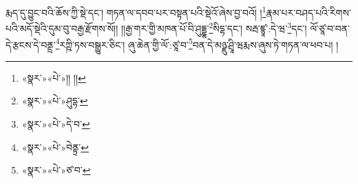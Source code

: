 རྨད་དུ་བྱུང་བའི་ཆོས་ཀྱི་སྡེ་དང་། གཏན་ལ་དབབ་པར་བསྟན་པའི་སྡེའོ་ཞེས་བྱ་བའོ། །\footnote{«སྣར་»«པེ་»།། །།}རྣམ་པར་བཤད་པའི་རིགས་པའི་མདོ་སྡེའི་དུམ་བུ་བརྒྱ་རྫོགས་སོ།། །།རྒྱ་གར་གྱི་མཁན་པོ་བི་ཤུདྡྷ་\footnote{«སྣར་»«པེ་»ཤུདྷ་}སིདྷ་དང་། སརྦ་ཛྙཱ་:དེ་ཝ་\footnote{«སྣར་»«པེ་»དེ་བ་}དང་། ལོ་ཙཱ་བ་བན་དེ་རྩངས་དེ་བནྡྲ་\footnote{«སྣར་»«པེ་»བེནྟྲ་}རཀྵི་ཏས་བསྒྱུར་ཅིང་། ཞུ་ཆེན་གྱི་ལོ་:ཙཱ་བ་\footnote{«སྣར་»«པེ་»ཙ་བ་}བན་དེ་མཉྫུ་ཤྲཱི་ཝརྨས་ཞུས་ཏེ་གཏན་ལ་ཕབ་པ། ། 